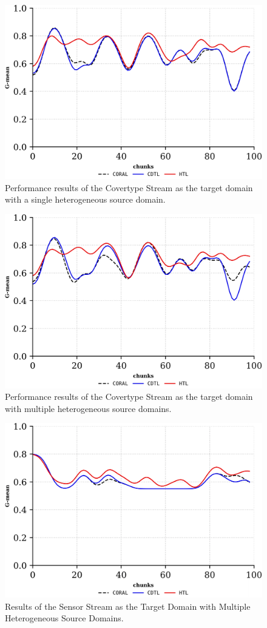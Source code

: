 \begin{figure}[H]
	\centering
	\includegraphics[width=0.8\linewidth]{6_transfer_learning/figures/exp2_0.png}
  \caption{Performance results of the Covertype Stream as the target domain with a single heterogeneous source domain.}

	\label{fig:6_exp3}
\end{figure}
\begin{figure}[H]
	\centering
	\includegraphics[width=0.8\linewidth]{6_transfer_learning/figures/exp2_1.png}
  \caption{Performance results of the Covertype Stream as the target domain with multiple heterogeneous source domains.}

	\label{fig:6_exp4}
\end{figure}
\begin{figure}[H]
	\centering
	\includegraphics[width=0.8\linewidth]{6_transfer_learning/figures/exp3.png}
  \caption{Results of the Sensor Stream as the Target Domain with Multiple Heterogeneous Source Domains.}

	\label{fig:6_exp5}
\end{figure}


